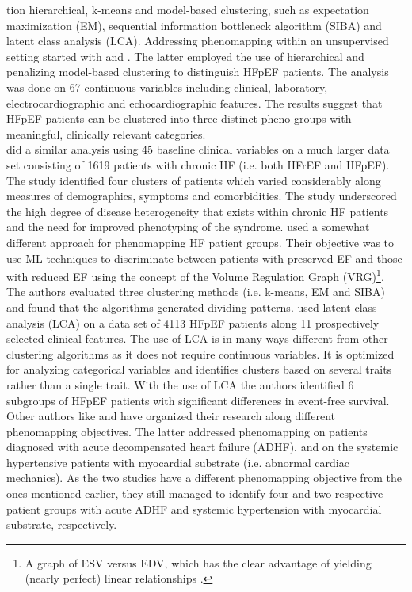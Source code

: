 \documentclass[../thesis.tex]{subfiles}
\begin{document}
\noindent tion hierarchical, k-means and model-based clustering, such as expectation maximization (EM), sequential information bottleneck algorithm (SIBA) and latent class analysis (LCA). Addressing phenomapping within an unsupervised setting started with \cite{ahmad2014clinical} and \cite{shah2014phenomapping}. The latter employed the use of hierarchical and penalizing model-based clustering to distinguish HFpEF patients. The analysis was done on 67 continuous variables including clinical, laboratory, electrocardiographic and echocardiographic features. The results suggest that HFpEF patients can be clustered into three distinct pheno-groups with meaningful, clinically relevant categories.\\
\indent \cite{ahmad2014clinical} did a similar analysis using 45 baseline clinical variables on a much larger data set consisting of 1619 patients with chronic HF (i.e. both HFrEF and HFpEF). The study identified four clusters of patients which varied considerably along measures of demographics, symptoms and comorbidities. The study underscored the high degree of disease heterogeneity that exists within chronic HF patients and the need for improved phenotyping of the syndrome. \cite{alonso2015exploring} used a somewhat different approach for phenomapping HF patient groups. Their objective was to use ML techniques to discriminate between patients with preserved EF and those with reduced EF using the concept of the Volume Regulation Graph (VRG)\footnote{A graph of ESV versus EDV, which has the clear advantage of yielding (nearly perfect) linear relationships \citep{beringer1998unifying}.}. The authors evaluated three clustering methods (i.e. k-means, EM and SIBA) and found that the algorithms generated dividing patterns. \cite{kao2015characterization} used latent class analysis (LCA) on a data set of 4113 HFpEF patients along 11 prospectively selected clinical features. The use of LCA is in many ways different from other clustering algorithms as it does not require continuous variables. It is optimized for analyzing categorical variables and identifies clusters based on several traits rather than a single trait. With the use of LCA the authors identified 6 subgroups of HFpEF patients with significant differences in event-free survival. Other authors like \cite{katz2017phenomapping} and \cite{ahmad2016clinical} have organized their research along different phenomapping objectives. The latter addressed phenomapping on patients diagnosed with acute decompensated heart failure (ADHF), and \cite{katz2017phenomapping} on the systemic hypertensive patients with myocardial substrate (i.e. abnormal cardiac mechanics). As the two studies have a different phenomapping objective from the ones mentioned earlier, they still managed to identify four and two respective patient groups with acute ADHF and systemic hypertension with myocardial substrate, respectively.\\
\end{document}
